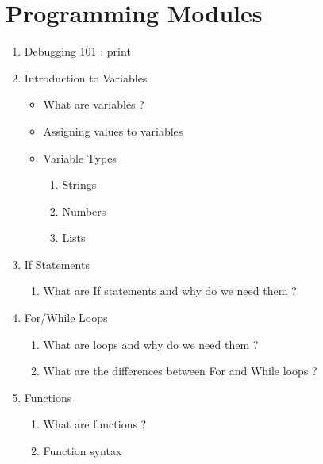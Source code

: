 \documentclass{article}
\begin{document}
\section{Programming Modules}
\begin{enumerate}
    \item Debugging 101 : print
    \item Introduction to Variables
        \begin{itemize}
            \item What are variables ?
            \item Assigning values to variables 
            \item Variable Types 
                \begin{enumerate}
                    \item Strings 
                    \item Numbers
                    \item Lists
                \end{enumerate}
        \end{itemize}
    \item If Statements
        \begin{enumerate}
            \item What are If statements and why do we need them ?
        \end{enumerate}
    \item For/While Loops 
            \begin{enumerate}
            \item What are loops and why do we need them ?
            \item What are the differences between For and While loops ?
        \end{enumerate}
    \item Functions
        \begin{enumerate}
            \item What are functions ?
            \item Function syntax
        \end{enumerate}
\end{enumerate}
\end{document}
